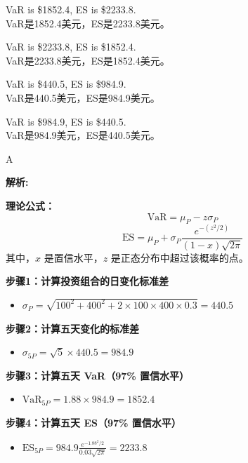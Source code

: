 \documentclass{article}
\newenvironment{explanation}
{\textbf{解析:}\par}
{\par}
\begin{document}
\begin{choices}
    \item VaR is \$1852.4, ES is \$2233.8.\\
    VaR是1852.4美元，ES是2233.8美元。
    \item VaR is \$2233.8, ES is \$1852.4.\\
    VaR是2233.8美元，ES是1852.4美元。
    \item VaR is \$440.5, ES is \$984.9.\\
    VaR是440.5美元，ES是984.9美元。
    \item VaR is \$984.9, ES is \$440.5.\\
    VaR是984.9美元，ES是440.5美元。
\end{choices}

\begin{correctanswer}
    A
\end{correctanswer}

\begin{explanation}
    \textbf{理论公式：}
    \[
    \text{VaR} = \mu_P - z\sigma_P
    \]
    \[
    \text{ES} = \mu_P + \sigma_P \frac{e^{-(z^2/2)}}{(1-x)\sqrt{2\pi}}
    \]
    其中，\(x\) 是置信水平，\(z\) 是正态分布中超过该概率的点。

    \textbf{步骤1：计算投资组合的日变化标准差}
    \begin{itemize}
        \item \(\sigma_P = \sqrt{100^2 + 400^2 + 2 \times 100 \times 400 \times 0.3} = 440.5\)
    \end{itemize}

    \textbf{步骤2：计算五天变化的标准差}
    \begin{itemize}
        \item \(\sigma_{5P} = \sqrt{5} \times 440.5 = 984.9\)
    \end{itemize}

    \textbf{步骤3：计算五天 VaR（97\% 置信水平）}
    \begin{itemize}
        \item \(\text{VaR}_{5P} = 1.88 \times 984.9 = 1852.4\)
    \end{itemize}

    \textbf{步骤4：计算五天 ES（97\% 置信水平）}
    \begin{itemize}
        \item \(\text{ES}_{5P} = 984.9 \frac{e^{-1.88^2/2}}{0.03\sqrt{2\pi}} = 2233.8\)
    \end{itemize}
\end{explanation}
\end{document}
